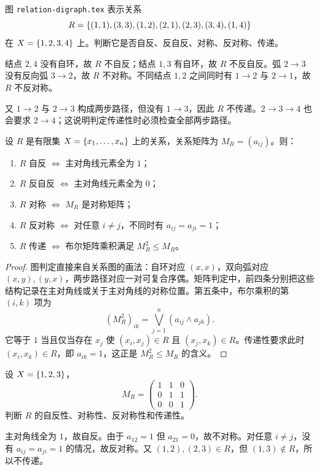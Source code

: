 \begin{example}[title={由关系图逐项判定性质}]\label{ch2-digraph-example}
图 \texttt{relation-digraph.tex} 表示关系
\[
R=\{(1,1),(3,3),(1,2),(2,1),(2,3),(3,4),(1,4)\}
\]
在 $X=\{1,2,3,4\}$ 上。判断它是否自反、反自反、对称、反对称、传递。
\begin{solution}
结点 $2,4$ 没有自环，故 $R$ 不自反；结点 $1,3$ 有自环，故 $R$ 不反自反。弧 $2\to3$ 没有反向弧 $3\to2$，故 $R$ 不对称。不同结点 $1,2$ 之间同时有 $1\to2$ 与 $2\to1$，故 $R$ 不反对称。

又 $1\to2$ 与 $2\to3$ 构成两步路径，但没有 $1\to3$，因此 $R$ 不传递。$2\to3\to4$ 也会要求 $2\to4$；这说明判定传递性时必须检查全部两步路径。
\end{solution}
\end{example}

\begin{theorem}[关系性质的矩阵与图判定]\label{ch2-matrix-graph-properties}
设 $R$ 是有限集 $X=\{x_1,\ldots,x_n\}$ 上的关系，关系矩阵为 $M_R=(a_{ij})$。则：
\begin{enumerate}
  \item $R$ 自反 $\Longleftrightarrow$ 主对角线元素全为 $1$；
  \item $R$ 反自反 $\Longleftrightarrow$ 主对角线元素全为 $0$；
  \item $R$ 对称 $\Longleftrightarrow$ $M_R$ 是对称矩阵；
  \item $R$ 反对称 $\Longleftrightarrow$ 对任意 $i\ne j$，不同时有 $a_{ij}=a_{ji}=1$；
  \item $R$ 传递 $\Longleftrightarrow$ 布尔矩阵乘积满足 $M_R^2\le M_R$。
\end{enumerate}
\end{theorem}

\begin{proof}
图判定直接来自关系图的画法：自环对应 $(x,x)$，双向弧对应 $(x,y),(y,x)$，两步路径对应一对可复合序偶。矩阵判定中，前四条分别把这些结构记录在主对角线或关于主对角线的对称位置。第五条中，布尔乘积的第 $(i,k)$ 项为
\[
  (M_R^2)_{ik}=\bigvee_{j=1}^n(a_{ij}\wedge a_{jk}).
\]
它等于 $1$ 当且仅当存在 $x_j$ 使 $(x_i,x_j)\in R$ 且 $(x_j,x_k)\in R$。传递性要求此时 $(x_i,x_k)\in R$，即 $a_{ik}=1$，这正是 $M_R^2\le M_R$ 的含义。
\end{proof}

\begin{example}[title={用矩阵判定性质}]\label{ch2-matrix-example}
设 $X=\{1,2,3\}$，
\[
M_R=\begin{pmatrix}
1&1&0\\
0&1&1\\
0&0&1
\end{pmatrix}.
\]
判断 $R$ 的自反性、对称性、反对称性和传递性。
\begin{solution}
主对角线全为 $1$，故自反。由于 $a_{12}=1$ 但 $a_{21}=0$，故不对称。对任意 $i\ne j$，没有 $a_{ij}=a_{ji}=1$ 的情况，故反对称。又 $(1,2),(2,3)\in R$，但 $(1,3)\notin R$，所以不传递。
\end{solution}
\end{example}

